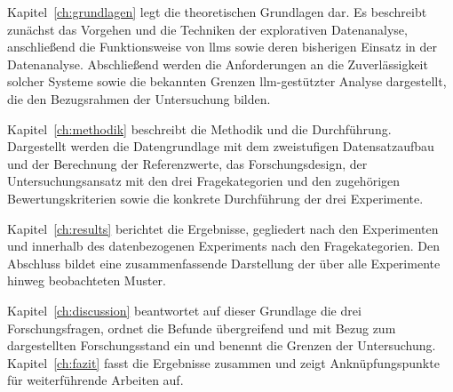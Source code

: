 Kapitel~\ref{ch:grundlagen} legt die theoretischen Grundlagen dar. Es beschreibt zunächst das Vorgehen und die Techniken der explorativen Datenanalyse, anschließend die Funktionsweise von \glspl{llm} sowie deren bisherigen Einsatz in der Datenanalyse. Abschließend werden die Anforderungen an die Zuverlässigkeit solcher Systeme sowie die bekannten Grenzen \gls{llm}-gestützter Analyse dargestellt, die den Bezugsrahmen der Untersuchung bilden.

Kapitel~\ref{ch:methodik} beschreibt die Methodik und die Durchführung. Dargestellt werden die Datengrundlage mit dem zweistufigen Datensatzaufbau und der Berechnung der Referenzwerte, das Forschungsdesign, der Untersuchungsansatz mit den drei Fragekategorien und den zugehörigen Bewertungskriterien sowie die konkrete Durchführung der drei Experimente.

Kapitel~\ref{ch:results} berichtet die Ergebnisse, gegliedert nach den Experimenten und innerhalb des datenbezogenen Experiments nach den Fragekategorien. Den Abschluss bildet eine zusammenfassende Darstellung der über alle Experimente hinweg beobachteten Muster.

Kapitel~\ref{ch:discussion} beantwortet auf dieser Grundlage die drei Forschungsfragen, ordnet die Befunde übergreifend und mit Bezug zum dargestellten Forschungsstand ein und benennt die Grenzen der Untersuchung. Kapitel~\ref{ch:fazit} fasst die Ergebnisse zusammen und zeigt Anknüpfungspunkte für weiterführende Arbeiten auf.